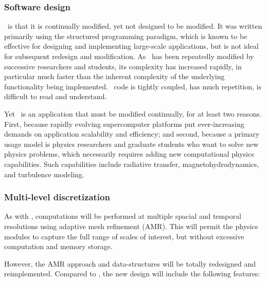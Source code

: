 \documentclass{article}
\begin{document}
    \subsubsection{Software design}

    \enzo\ is that it is continually modified, yet not designed to be
    modified.  It was written primarily using the structured
    programming paradigm, which is known to be effective for designing
    and implementing large-scale applications, but is not ideal for
    subsequent redesign and modification.  As \enzo\ has been
    repeatedly modified by successive researchers and students, its
    complexity has increased rapidly, in particular much faster than
    the inherent complexity of the underlying functionality being
    implemented.
%
    \enzo\ code is tightly coupled, has much repetition, is difficult
    to read and understand.

    Yet \enzo\ is an application that must be modified continually,
    for at least two reasons.  First, because rapidly evolving
    supercomputer platforms put ever-increasing demands on application
    scalability and efficiency; and second, because a primary usage
    model is physics researchers and graduate students who want to
    solve new physics problems, which necessarily requires adding new
    computational physics capabilities.  Such capabilities include
    radiative transfer, magnetohydrodynamics, and turbulence modeling.

    \subsubsection{Multi-level discretization}

    As with \enzo, computations will be performed at multiple spacial
    and temporal resolutions using adaptive mesh refinement (AMR).
    This will permit the physics modules to capture the full range of
    scales of interest, but without excessive computation and memory
    storage.  

    However, the AMR approach and data-structures will be totally
    redesigned and reimplemented.  Compared to \enzo, the new design
    will include the following features:
\end{document}
